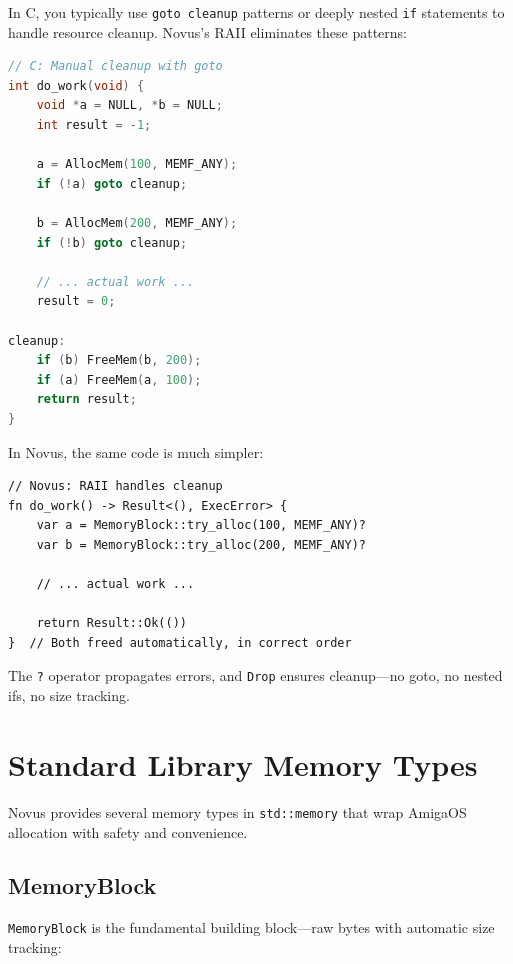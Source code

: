 \begin{comingfromc}
In C, you typically use \texttt{goto cleanup} patterns or deeply nested \texttt{if} statements to handle resource cleanup. Novus's RAII eliminates these patterns:

\begin{lstlisting}[language=C]
// C: Manual cleanup with goto
int do_work(void) {
    void *a = NULL, *b = NULL;
    int result = -1;

    a = AllocMem(100, MEMF_ANY);
    if (!a) goto cleanup;

    b = AllocMem(200, MEMF_ANY);
    if (!b) goto cleanup;

    // ... actual work ...
    result = 0;

cleanup:
    if (b) FreeMem(b, 200);
    if (a) FreeMem(a, 100);
    return result;
}
\end{lstlisting}

In Novus, the same code is much simpler:

\begin{lstlisting}
// Novus: RAII handles cleanup
fn do_work() -> Result<(), ExecError> {
    var a = MemoryBlock::try_alloc(100, MEMF_ANY)?
    var b = MemoryBlock::try_alloc(200, MEMF_ANY)?

    // ... actual work ...

    return Result::Ok(())
}  // Both freed automatically, in correct order
\end{lstlisting}

The \texttt{?} operator propagates errors, and \texttt{Drop} ensures cleanup---no goto, no nested ifs, no size tracking.
\end{comingfromc}

\section{Standard Library Memory Types}

Novus provides several memory types in \texttt{std::memory} that wrap AmigaOS allocation with safety and convenience.

\subsection{MemoryBlock}

\texttt{MemoryBlock} is the fundamental building block---raw bytes with automatic size tracking:

